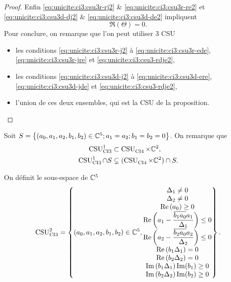 \begin{proof}
    Enfin \eqref{eq:unicite:ci3:csu3r-rj2} \& \eqref{eq:unicite:ci3:csu3r-re2} et \eqref{eq:unicite:ci3:csu3d-dj2} \& \eqref{eq:unicite:ci3:csu3d-de2} impliquent
    \begin{equation}
      \label{eq:unicite:ci3:csu3-rdje2}
      \Re\left(\Theta\right) = 0.
    \end{equation}
    Pour conclure, on remarque que l'on peut utiliser 3 CSU
    \begin{itemize}
      \item les conditions \eqref{eq:unicite:ci3:csu3r-j2} à \eqref{eq:unicite:ci3:csu3r-ede}, \eqref{eq:unicite:ci3:csu3r-jre} et \eqref{eq:unicite:ci3:csu3-rdje2},
      \item les conditions \eqref{eq:unicite:ci3:csu3d-j2} à \eqref{eq:unicite:ci3:csu3d-ere}, \eqref{eq:unicite:ci3:csu3d-jde} et \eqref{eq:unicite:ci3:csu3-rdje2}, 
      \item l'union de ces deux ensembles, qui est la CSU de la proposition.
    \end{itemize}
  \end{proof}

  Soit \(S = \left\lbrace (a_0,a_1,a_2,b_1,b_2) \in \CC^5 ; a_1 = a_2 ; b_1 = b_2 = 0 \right\rbrace \). On remarque que
  \begin{align}
    \CSU[1]{CI3} & \subset \CSU{CI4}\times\CC^2,
    \\
    \CSU[1]{CI3}\cap S & \subsetneq (\CSU{CI4}\times\CC^2)\cap S.
  \end{align}

  \begin{defn}
    \label{def:csu:ci3-2}

    On définit le sous-espace de \(\CC^5\)
    \begin{equation*}
      \CSU[2]{CI3} = \left\lbrace 
      (a_0,a_1,a_2,b_1,b_2) \in \CC^5,
      \begin{matrix}
      \Delta_1 \not = 0
      \\
      \Delta_2 \not = 0
      \\
      \Re\left(a_0\right)\ge 0
      \\
      \Re\left(a_1 - \frac{\conj{b_1a_0}a_1}{\Delta_1}\right) \le 0
      \\
      \Re\left(a_2 - \frac{\conj{b_2a_0}a_2}{\Delta_2}\right) \le 0
      \\
      \Re\left(b_1\Delta_1\right) = 0
      \\
      \Re\left(b_2\Delta_2\right) = 0
      \\
      \Im\left(b_1\Delta_1\right)\Im(b_1)\ge 0
      \\
      \Im\left(b_2\Delta_2\right)\Im(b_2)\ge 0
      \end{matrix}
      \right\rbrace.
    \end{equation*}
  \end{defn}

